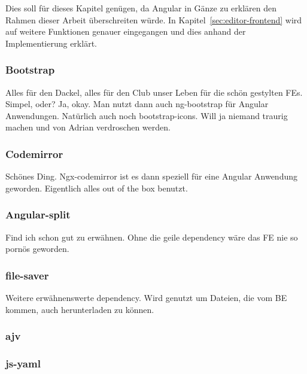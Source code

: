 Dies soll für dieses Kapitel genügen, da Angular in Gänze zu erklären den Rahmen dieser Arbeit überschreiten würde.
In Kapitel~\ref{sec:editor-frontend} wird auf weitere Funktionen genauer eingegangen und dies anhand der Implementierung erklärt.

\subsubsection{Bootstrap}
\todo
Alles für den Dackel, alles für den Club unser Leben für die schön gestylten FEs.
Simpel, oder?
Ja, okay.
Man nutzt dann auch ng-bootstrap für Angular Anwendungen.
Natürlich auch noch bootstrap-icons.
Will ja niemand traurig machen und von Adrian verdroschen werden.

\subsubsection{Codemirror}
\todo
Schönes Ding.
Ngx-codemirror ist es dann speziell für eine Angular Anwendung geworden.
Eigentlich alles out of the box benutzt.

\subsubsection{Angular-split}
\todo
Find ich schon gut zu erwähnen.
Ohne die geile dependency wäre das FE nie so pornös geworden.

\subsubsection{file-saver}
\todo
Weitere erwähnenswerte dependency.
Wird genutzt um Dateien, die vom BE kommen, auch herunterladen zu können.

\subsubsection{ajv}
\todo

\subsubsection{js-yaml}
\todo
